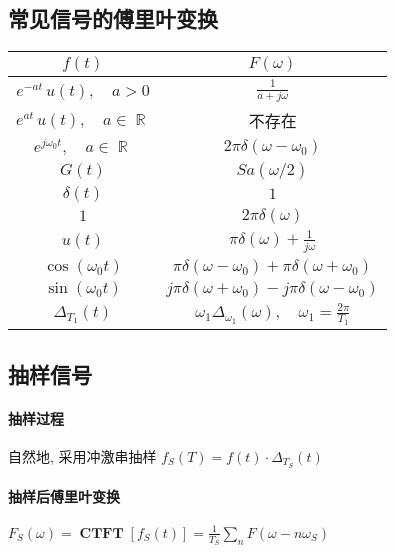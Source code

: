 \documentclass{ctexart}
\DeclareMathOperator{\CTFT}{\mathbf{CTFT}}
\DeclareMathOperator{\Rset}{\mathbb{R}}
\begin{document}
\subsection{常见信号的傅里叶变换}
    \begin{table}[ht!]
        \centering
        \begin{tabular}{|c|c|}
                \hline $\displaystyle f(t)$ & $\displaystyle F(\omega)$ \\ \hline
                $\displaystyle e^{-at}\,u(t),\quad a > 0$ & $\displaystyle \frac{1}{a + j \omega}$ \\ \hline
                $\displaystyle e^{at}\,u(t),\quad a \in \Rset$ & 不存在 \\ \hline
                $\displaystyle e^{j \omega_0 t},\quad a \in \Rset$ & $\displaystyle 2 \pi \delta(\omega - \omega_0)$ \\ \hline
                $\displaystyle G(t)$ & $\displaystyle Sa(\omega / 2)$ \\ \hline
                $\displaystyle \delta(t)$ & $\displaystyle 1$ \\ \hline
                $\displaystyle 1$ & $\displaystyle 2\pi \delta(\omega)$ \\ \hline
                $\displaystyle u(t)$ & $\displaystyle \pi\delta(\omega) + \frac{1}{j\omega}$ \\ \hline
                $\displaystyle \cos (\omega_0 t)$ & $\displaystyle \pi \delta(\omega - \omega_0) + \pi \delta(\omega + \omega_0)$ \\ \hline
                $\displaystyle \sin (\omega_0 t)$ & $\displaystyle j \pi \delta(\omega + \omega_0) - j \pi \delta(\omega - \omega_0)$ \\ \hline
                $\displaystyle \Delta_{T_1} (t)$ & $\displaystyle \omega_1 \Delta_{\omega_1}(\omega),\quad \omega_1 = \frac{2\pi}{T_1}$ \\ \hline
        \end{tabular}
    \end{table}

\subsection{抽样信号}
\paragraph{抽样过程} 自然地, 采用冲激串抽样 $f_S(T) = f(t)\cdot \Delta_{T_S}(t)$
\paragraph{抽样后傅里叶变换} $\displaystyle F_S(\omega) = \CTFT[ f_S(t) ] = \frac{1}{T_S} \sum_n F(\omega - n \omega_S)$
\end{document}
